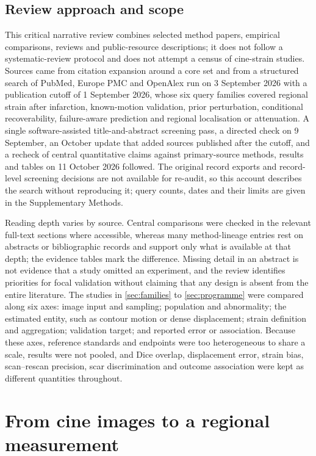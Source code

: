 \subsection{Review approach and scope}

This critical narrative review combines selected method papers, empirical comparisons, reviews and public-resource descriptions; it does not follow a systematic-review protocol and does not attempt a census of cine-strain studies. Sources came from citation expansion around a core set and from a structured search of PubMed, Europe PMC and OpenAlex run on 3 September 2026 with a publication cutoff of 1 September 2026, whose six query families covered regional strain after infarction, known-motion validation, prior perturbation, conditional recoverability, failure-aware prediction and regional localisation or attenuation. A single software-assisted title-and-abstract screening pass, a directed check on 9 September, an October update that added sources published after the cutoff, and a recheck of central quantitative claims against primary-source methods, results and tables on 11 October 2026 followed. The original record exports and record-level screening decisions are not available for re-audit, so this account describes the search without reproducing it; query counts, dates and their limits are given in the Supplementary Methods.

Reading depth varies by source. Central comparisons were checked in the relevant full-text sections where accessible, whereas many method-lineage entries rest on abstracts or bibliographic records and support only what is available at that depth; the evidence tables mark the difference. Missing detail in an abstract is not evidence that a study omitted an experiment, and the review identifies priorities for focal validation without claiming that any design is absent from the entire literature. The studies in \cref{sec:families} to \cref{sec:programme} were compared along six axes: image input and sampling; population and abnormality; the estimated entity, such as contour motion or dense displacement; strain definition and aggregation; validation target; and reported error or association. Because these axes, reference standards and endpoints were too heterogeneous to share a scale, results were not pooled, and Dice overlap, displacement error, strain bias, scan--rescan precision, scar discrimination and outcome association were kept as different quantities throughout.

\section{From cine images to a regional measurement}

